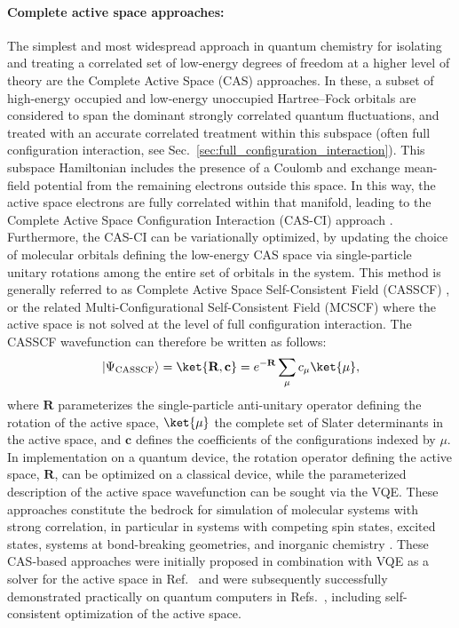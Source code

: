 \paragraph{Complete active space approaches:} 
The simplest and most widespread approach in quantum chemistry for isolating and treating a correlated set of low-energy degrees of freedom at a higher level of theory are the Complete Active Space (CAS) approaches. In these, a subset of high-energy occupied and low-energy unoccupied Hartree--Fock orbitals are considered to span the dominant strongly correlated quantum fluctuations, and treated with an accurate correlated treatment within this subspace (often full configuration interaction, see Sec.~\ref{sec:full_configuration_interaction}). This subspace Hamiltonian includes the presence of a Coulomb and exchange mean-field potential from the remaining electrons outside this space. In this way, the active space electrons are fully correlated within that manifold, leading to the Complete Active Space Configuration Interaction (CAS-CI) approach \cite{Jensen2017, Levine2021}. Furthermore, the CAS-CI can be variationally optimized, by updating the choice of molecular orbitals defining the low-energy CAS space via single-particle unitary rotations among the entire set of orbitals in the system. 
This method is generally referred to as Complete Active Space Self-Consistent Field (CASSCF) \cite{Roos1980, Sun2017}, or the related Multi-Configurational Self-Consistent Field (MCSCF) where the active space is not solved at the level of full configuration interaction. The CASSCF wavefunction can therefore be written as follows:
\begin{align}
\label{eq:QCAS_WF_1}
    |\Psi_{\mathrm{CASSCF}} \rangle = \ket{\textbf{R}, \textbf{c}} = e^{-\textbf{R}} \sum_{\mu} c_{\mu} \ket{\mu},
\end{align}
where $\textbf{R}$ parameterizes the single-particle anti-unitary operator defining the rotation of the active space, $\ket{\mu}$ the complete set of Slater determinants in the active space, and $\textbf{c}$ defines the coefficients of the configurations indexed by $\mu$. In implementation on a quantum device, the rotation operator defining the active space, $\textbf{R}$, can be optimized on a classical device, while the parameterized description of the active space wavefunction can be sought via the VQE. These approaches constitute the bedrock for simulation of molecular systems with strong correlation, in particular in systems with competing spin states, excited states, systems at bond-breaking geometries, and inorganic chemistry \cite{RetaManeru2014,Li2015,olsen11}. These CAS-based approaches were initially proposed in combination with VQE as a solver for the active space in Ref.~\cite{reiherElucidatingReactionMechanisms2017} and were subsequently successfully demonstrated practically on quantum computers in Refs.~\cite{Takeshita2020, Yalouz2021, Tilly2021}, including self-consistent optimization of the active space. 

